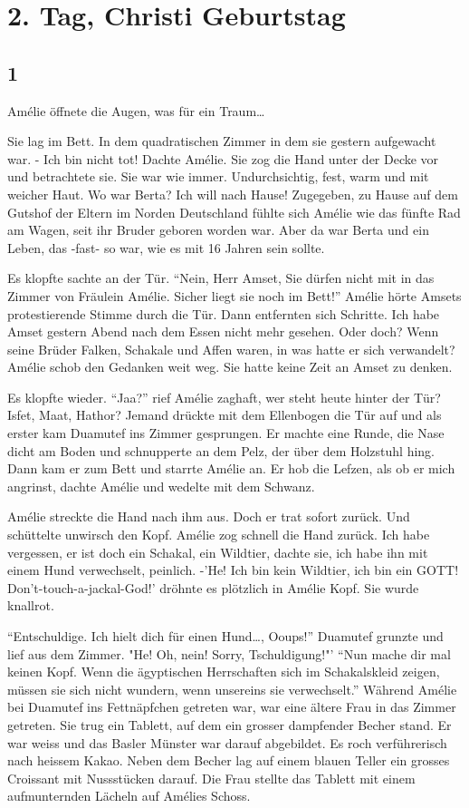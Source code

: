 \documentclass[11pt,titlepage,a5paper]{book}
\begin{document}
\chapter*{2. Tag, Christi Geburtstag}

\section*{1}

Amélie öffnete die Augen, was für ein Traum\dots

Sie lag im Bett. In dem quadratischen Zimmer in dem sie gestern aufgewacht war. - Ich bin nicht tot! Dachte Amélie. Sie zog die Hand unter der Decke vor und betrachtete sie. Sie war wie immer. Undurchsichtig, fest, warm und mit weicher Haut. Wo war Berta? Ich will nach Hause! Zugegeben, zu Hause auf dem Gutshof der Eltern im Norden Deutschland fühlte sich Amélie wie das fünfte Rad am Wagen, seit ihr Bruder geboren worden war. Aber da war Berta und ein Leben, das -fast- so war, wie es mit 16 Jahren sein sollte.

Es klopfte sachte an der Tür. "`Nein, Herr Amset, Sie dürfen nicht mit in das Zimmer von Fräulein Amélie. Sicher liegt sie noch im Bett!"' Amélie hörte Amsets protestierende Stimme durch die Tür. Dann entfernten sich Schritte. Ich habe Amset gestern Abend nach dem Essen nicht mehr gesehen. Oder doch? Wenn seine Brüder Falken, Schakale und Affen waren, in was hatte er sich verwandelt? Amélie schob den Gedanken weit weg. Sie hatte keine Zeit an Amset zu denken. 

Es klopfte wieder. "`Jaa?"' rief Amélie zaghaft, wer steht heute hinter der Tür? Isfet, Maat, Hathor? Jemand drückte mit dem Ellenbogen die Tür auf und als erster kam Duamutef ins Zimmer gesprungen. Er machte eine Runde, die Nase dicht am Boden und schnupperte an dem Pelz, der über dem Holzstuhl hing. Dann kam er zum Bett und starrte Amélie an. Er hob die Lefzen, als ob er mich angrinst, dachte Amélie und wedelte mit dem Schwanz. 

Amélie streckte die Hand nach ihm aus. Doch er trat sofort zurück. Und schüttelte unwirsch den Kopf. Amélie zog schnell die Hand zurück. Ich habe vergessen, er ist doch ein Schakal, ein Wildtier, dachte sie, ich habe ihn mit einem Hund verwechselt, peinlich. -'He! Ich bin kein Wildtier, ich bin ein GOTT! Don't-touch-a-jackal-God!' dröhnte es plötzlich in Amélie Kopf. Sie wurde knallrot.

 "`Entschuldige. Ich hielt dich für einen Hund\dots, Ooups!"' Duamutef grunzte und lief aus dem Zimmer. "He! Oh, nein! Sorry, Tschuldigung!"' "`Nun mache dir mal keinen Kopf. Wenn die ägyptischen Herrschaften sich im Schakalskleid zeigen, müssen sie sich nicht wundern, wenn unsereins sie verwechselt."' Während Amélie bei Duamutef ins Fettnäpfchen getreten war, war eine ältere Frau in das Zimmer getreten. Sie trug ein Tablett, auf dem ein grosser dampfender Becher stand. Er war weiss und das Basler Münster war darauf abgebildet. Es roch verführerisch nach heissem Kakao. Neben dem Becher lag auf einem blauen Teller ein grosses Croissant mit Nussstücken darauf. Die Frau stellte das Tablett mit einem aufmunternden Lächeln auf Amélies Schoss.
 
\end{document}
